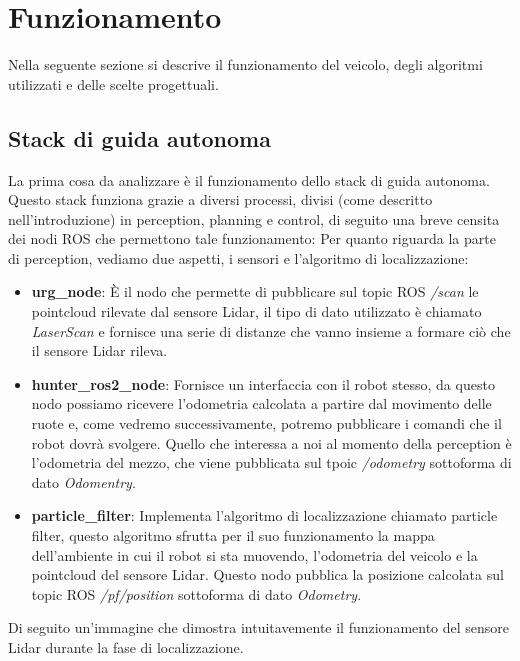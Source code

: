 \section{Funzionamento}
Nella seguente sezione si descrive il funzionamento del veicolo, degli algoritmi utilizzati e delle scelte progettuali.

\subsection{Stack di guida autonoma}
La prima cosa da analizzare è il funzionamento dello stack di guida autonoma.
Questo stack funziona grazie a diversi processi, divisi (come descritto nell'introduzione) in perception, planning e control, di seguito una breve censita dei nodi ROS che permettono tale funzionamento:
Per quanto riguarda la parte di perception, vediamo due aspetti, i sensori e l'algoritmo di localizzazione:

\begin{itemize}
  \item \textbf{urg\_node}: È il nodo che permette di pubblicare sul topic ROS \textit{/scan} le pointcloud rilevate dal sensore Lidar, il tipo di dato utilizzato è chiamato \textit{LaserScan} e fornisce una serie di distanze che vanno insieme a formare ciò che il sensore Lidar rileva.
  \item \textbf{hunter\_ros2\_node}: Fornisce un interfaccia con il robot stesso, da questo nodo possiamo ricevere l'odometria calcolata a partire dal movimento delle ruote e, come vedremo successivamente, potremo pubblicare i comandi che il robot dovrà svolgere. Quello che interessa a noi al momento della perception è l'odometria del mezzo, che viene pubblicata sul tpoic \textit{/odometry} sottoforma di dato \textit{Odomentry}. 
  \item \textbf{particle\_filter}: Implementa l'algoritmo di localizzazione chiamato particle filter, questo algoritmo sfrutta per il suo funzionamento la mappa dell'ambiente in cui il robot si sta muovendo, l'odometria del veicolo e la pointcloud del sensore Lidar. Questo nodo pubblica la posizione calcolata sul topic ROS \textit{/pf/position} sottoforma di dato \textit{Odometry}.
\end{itemize}

\noindent Di seguito un'immagine che dimostra intuitavemente il funzionamento del sensore Lidar durante la fase di localizzazione.


